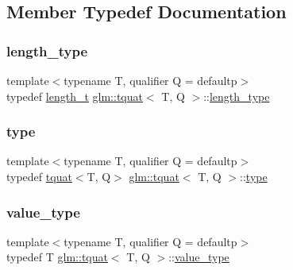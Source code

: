 \subsection{Member Typedef Documentation}
\mbox{\label{structglm_1_1tquat_a6d9ab28781d7835b30216a996484c026}} 
\subsubsection{\texorpdfstring{length\+\_\+type}{length\_type}}
{\footnotesize\ttfamily template$<$typename T, qualifier Q = defaultp$>$ \\
typedef \mbox{\hyperlink{namespaceglm_a090a0de2260835bee80e71a702492ed9}{length\+\_\+t}} \mbox{\hyperlink{structglm_1_1tquat}{glm\+::tquat}}$<$ T, Q $>$\+::\mbox{\hyperlink{structglm_1_1tquat_a6d9ab28781d7835b30216a996484c026}{length\+\_\+type}}}

\mbox{\label{structglm_1_1tquat_ae9600f57e83d084305f1c801150fbd36}} 
\subsubsection{\texorpdfstring{type}{type}}
{\footnotesize\ttfamily template$<$typename T, qualifier Q = defaultp$>$ \\
typedef \mbox{\hyperlink{structglm_1_1tquat}{tquat}}$<$T, Q$>$ \mbox{\hyperlink{structglm_1_1tquat}{glm\+::tquat}}$<$ T, Q $>$\+::\mbox{\hyperlink{structglm_1_1tquat_ae9600f57e83d084305f1c801150fbd36}{type}}}

\mbox{\label{structglm_1_1tquat_ac02efd34879e12e77f5143df3708b070}} 
\subsubsection{\texorpdfstring{value\+\_\+type}{value\_type}}
{\footnotesize\ttfamily template$<$typename T, qualifier Q = defaultp$>$ \\
typedef T \mbox{\hyperlink{structglm_1_1tquat}{glm\+::tquat}}$<$ T, Q $>$\+::\mbox{\hyperlink{structglm_1_1tquat_ac02efd34879e12e77f5143df3708b070}{value\+\_\+type}}}



